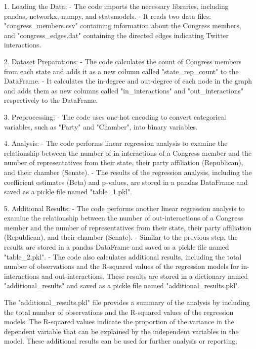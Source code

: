 \documentclass[11pt]{article}
\begin{document}
1. Loading the Data:
   - The code imports the necessary libraries, including pandas, networkx, numpy, and statsmodels.
   - It reads two data files: "congress\_members.csv" containing information about the Congress members, and "congress\_edges.dat" containing the directed edges indicating Twitter interactions.
   
2. Dataset Preparations:
   - The code calculates the count of Congress members from each state and adds it as a new column called "state\_rep\_count" to the DataFrame.
   - It calculates the in-degree and out-degree of each node in the graph and adds them as new columns called "in\_interactions" and "out\_interactions" respectively to the DataFrame.
   
3. Preprocessing:
   - The code uses one-hot encoding to convert categorical variables, such as "Party" and "Chamber", into binary variables.
   
4. Analysis:
   - The code performs linear regression analysis to examine the relationship between the number of in-interactions of a Congress member and the number of representatives from their state, their party affiliation (Republican), and their chamber (Senate).
   - The results of the regression analysis, including the coefficient estimates (Beta) and p-values, are stored in a pandas DataFrame and saved as a pickle file named "table\_1.pkl".
   
5. Additional Results:
   - The code performs another linear regression analysis to examine the relationship between the number of out-interactions of a Congress member and the number of representatives from their state, their party affiliation (Republican), and their chamber (Senate).
   - Similar to the previous step, the results are stored in a pandas DataFrame and saved as a pickle file named "table\_2.pkl".
   - The code also calculates additional results, including the total number of observations and the R-squared values of the regression models for in-interactions and out-interactions. These results are stored in a dictionary named "additional\_results" and saved as a pickle file named "additional\_results.pkl".

The "additional\_results.pkl" file provides a summary of the analysis by including the total number of observations and the R-squared values of the regression models. The R-squared values indicate the proportion of the variance in the dependent variable that can be explained by the independent variables in the model. These additional results can be used for further analysis or reporting.
\end{document}
